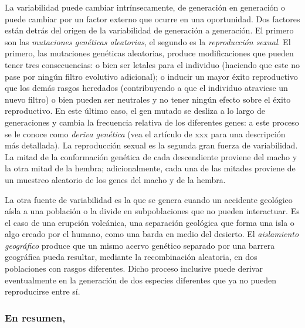 \documentclass[
  letterpaper,
]{book}
\begin{document}
La variabilidad puede cambiar intrínsecamente, de generación en
generación o puede cambiar por un factor externo que ocurre en una
oportunidad. Dos factores están detrás del origen de la variabilidad de
generación a generación. El primero son las \emph{mutaciones genéticas
aleatorias}, el segundo es la \emph{reproducción sexual}. El primero,
las mutaciones genéticas aleatorias, produce modificaciones que pueden
tener tres consecuencias: o bien ser letales para el individuo (haciendo
que este no pase por ningún filtro evolutivo adicional); o inducir un
mayor éxito reproductivo que los demás rasgos heredados (contribuyendo a
que el individuo atraviese un nuevo filtro) o bien pueden ser neutrales
y no tener ningún efecto sobre el éxito reproductivo. En este último
caso, el gen mutado se desliza a lo largo de generaciones y cambia la
frecuencia relativa de los diferentes genes: a este proceso se le conoce
como \emph{deriva genética} (vea el artículo de xxx para una descripción
más detallada). La reproducción sexual es la segunda gran fuerza de
variabilidad. La mitad de la conformación genética de cada descendiente
proviene del macho y la otra mitad de la hembra; adicionalmente, cada
una de las mitades proviene de un muestreo aleatorio de los genes del
macho y de la hembra.

La otra fuente de variabilidad es la que se genera cuando un accidente
geológico aísla a una población o la divide en subpoblaciones que no
pueden interactuar. Es el caso de una erupción volcánica, una separación
geológica que forma una isla o algo creado por el humano, como una barda
en medio del desierto. El \emph{aislamiento geográfico} produce que un
mismo acervo genético separado por una barrera geográfica pueda
resultar, mediante la recombinación aleatoria, en dos poblaciones con
rasgos diferentes. Dicho proceso inclusive puede derivar eventualmente
en la generación de dos especies diferentes que ya no pueden
reproducirse entre sí.

\subsubsection{En resumen,}\label{en-resumen}
\end{document}
